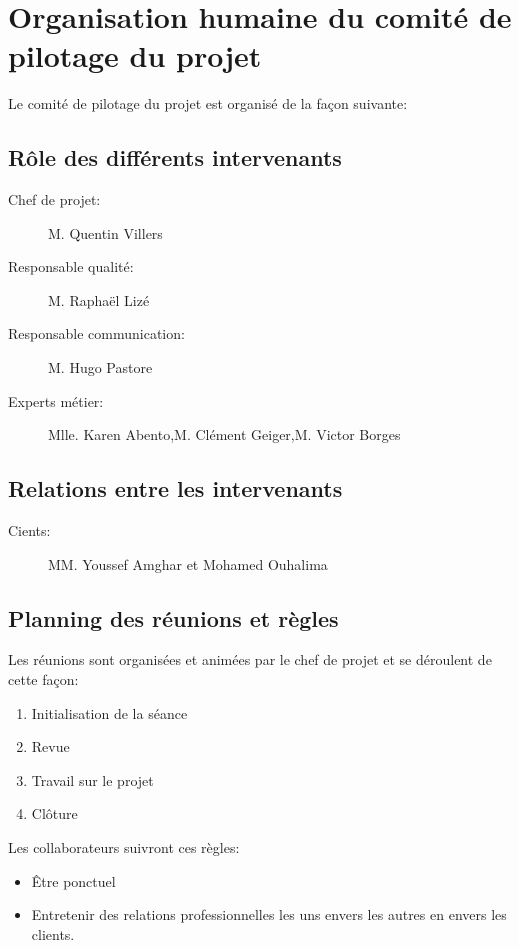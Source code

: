 
\section{Organisation humaine du comité de pilotage du projet}

Le comité de pilotage du projet est organisé de la façon suivante:

    \subsection{Rôle des différents intervenants}
\begin{description}
\item[Chef de projet:]M. Quentin Villers
\item[Responsable qualité:]M. Raphaël Lizé
\item[Responsable communication:]M. Hugo Pastore
\item[Experts métier:]Mlle. Karen Abento,M. Clément Geiger,M. Victor Borges
\end{description}

    \subsection{Relations entre les intervenants}
\begin{description}
\item[Cients:]MM. Youssef Amghar et Mohamed Ouhalima 
\end{description}

    \subsection{Planning des réunions et règles}
Les réunions sont organisées et animées par le chef de projet et se
déroulent de cette façon:
\begin{enumerate}
\item Initialisation de la séance
\item Revue
\item Travail sur le projet
\item Clôture
\end{enumerate}

Les collaborateurs suivront ces règles:
\begin{itemize}
\item Être ponctuel
\item Entretenir des relations professionnelles les uns envers les
        autres en envers les clients.
\end{itemize}
